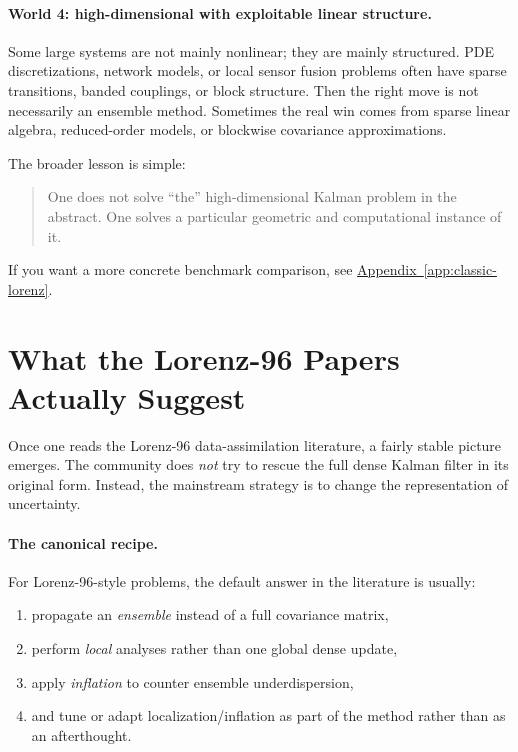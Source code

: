 \documentclass[12pt,a4paper]{article}
\begin{document}
\paragraph{World 4: high-dimensional with exploitable linear structure.}
Some large systems are not mainly nonlinear; they are mainly structured. PDE discretizations, network models, or local sensor fusion problems often have sparse transitions, banded couplings, or block structure. Then the right move is not necessarily an ensemble method. Sometimes the real win comes from sparse linear algebra, reduced-order models, or blockwise covariance approximations.

The broader lesson is simple:
\begin{quote}
One does not solve ``the'' high-dimensional Kalman problem in the abstract. One solves a particular geometric and computational instance of it.
\end{quote}

If you want a more concrete benchmark comparison, see \hyperref[app:classic-lorenz]{Appendix~\ref*{app:classic-lorenz}}.

\section{What the Lorenz-96 Papers Actually Suggest}

Once one reads the Lorenz-96 data-assimilation literature, a fairly stable picture emerges. The community does \emph{not} try to rescue the full dense Kalman filter in its original form. Instead, the mainstream strategy is to change the representation of uncertainty.

\paragraph{The canonical recipe.}
For Lorenz-96-style problems, the default answer in the literature is usually:
\begin{enumerate}
  \item propagate an \emph{ensemble} instead of a full covariance matrix,
  \item perform \emph{local} analyses rather than one global dense update,
  \item apply \emph{inflation} to counter ensemble underdispersion,
  \item and tune or adapt localization/inflation as part of the method rather than as an afterthought.
\end{enumerate}
\end{document}
